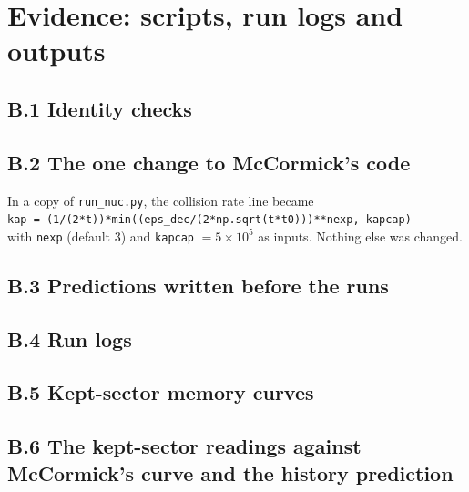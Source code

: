 \documentclass[11pt]{article}
\begin{document}


\section{Evidence: scripts, run logs and outputs}
\subsection*{B.1 Identity checks}


\subsection*{B.2 The one change to McCormick's code}
In a copy of \texttt{run\_nuc.py}, the collision rate line became\\
\texttt{kap = (1/(2*t))*min((eps\_dec/(2*np.sqrt(t*t0)))**nexp, kapcap)}\\
with \texttt{nexp} (default 3) and \texttt{kapcap} $=5\times10^5$ as inputs. Nothing else was changed.


\subsection*{B.3 Predictions written before the runs}

\subsection*{B.4 Run logs}






\subsection*{B.5 Kept-sector memory curves}


\subsection*{B.6 The kept-sector readings against McCormick's curve and the history prediction}





\end{document}
